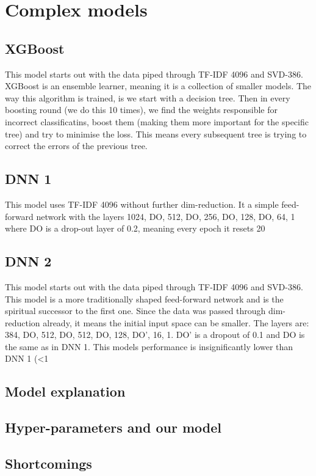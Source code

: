 \section{Complex models}
\subsection{XGBoost}
This model starts out with the data piped through TF-IDF 4096 and SVD-386. XGBoost is an ensemble learner, meaning it is a collection of smaller models. The way this algorithm is trained, is we start with a decision tree. Then in every boosting round (we do this 10 times), we find the weights responsible for incorrect classificatins, boost them (making them more important for the specific tree) and try to minimise the loss. This means every subsequent tree is trying to correct the errors of the previous tree.

\subsection{DNN 1}
This model uses TF-IDF 4096 without further dim-reduction. It a simple feed-forward network with the layers 1024, DO, 512, DO, 256, DO, 128, DO, 64, 1 where DO is a drop-out layer of 0.2, meaning every epoch it resets 20%

\subsection{DNN 2}
This model starts out with the data piped through TF-IDF 4096 and SVD-386. This model is a more traditionally shaped feed-forward network and is the spiritual successor to the first one. Since the data was passed through dim-reduction already, it means the initial input space can be smaller. The layers are: 384, DO, 512, DO, 512, DO, 128, DO', 16, 1. DO' is a dropout of 0.1 and DO is the same as in DNN 1. This models performance is insignificantly lower than DNN 1 (<1%

\subsection{Model explanation}
\subsection{Hyper-parameters and our model}
\subsection{Shortcomings}
